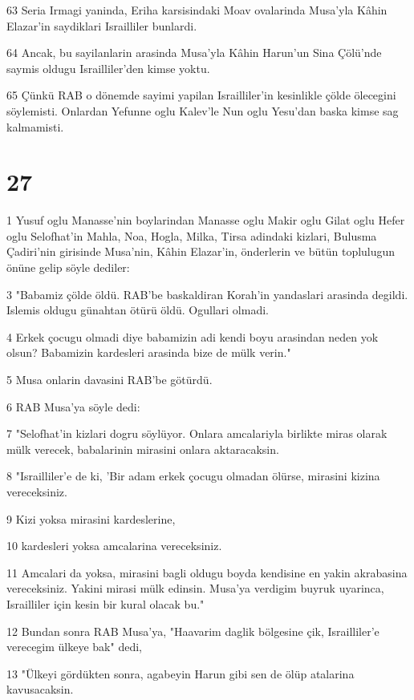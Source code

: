\par 63 Seria Irmagi yaninda, Eriha karsisindaki Moav ovalarinda Musa'yla Kâhin Elazar'in saydiklari Israilliler bunlardi.
\par 64 Ancak, bu sayilanlarin arasinda Musa'yla Kâhin Harun'un Sina Çölü'nde saymis oldugu Israilliler'den kimse yoktu.
\par 65 Çünkü RAB o dönemde sayimi yapilan Israilliler'in kesinlikle çölde ölecegini söylemisti. Onlardan Yefunne oglu Kalev'le Nun oglu Yesu'dan baska kimse sag kalmamisti.

\chapter{27}

\par 1 Yusuf oglu Manasse'nin boylarindan Manasse oglu Makir oglu Gilat oglu Hefer oglu Selofhat'in Mahla, Noa, Hogla, Milka, Tirsa adindaki kizlari, Bulusma Çadiri'nin girisinde Musa'nin, Kâhin Elazar'in, önderlerin ve bütün toplulugun önüne gelip söyle dediler:
\par 3 "Babamiz çölde öldü. RAB'be baskaldiran Korah'in yandaslari arasinda degildi. Islemis oldugu günahtan ötürü öldü. Ogullari olmadi.
\par 4 Erkek çocugu olmadi diye babamizin adi kendi boyu arasindan neden yok olsun? Babamizin kardesleri arasinda bize de mülk verin."
\par 5 Musa onlarin davasini RAB'be götürdü.
\par 6 RAB Musa'ya söyle dedi:
\par 7 "Selofhat'in kizlari dogru söylüyor. Onlara amcalariyla birlikte miras olarak mülk verecek, babalarinin mirasini onlara aktaracaksin.
\par 8 "Israilliler'e de ki, 'Bir adam erkek çocugu olmadan ölürse, mirasini kizina vereceksiniz.
\par 9 Kizi yoksa mirasini kardeslerine,
\par 10 kardesleri yoksa amcalarina vereceksiniz.
\par 11 Amcalari da yoksa, mirasini bagli oldugu boyda kendisine en yakin akrabasina vereceksiniz. Yakini mirasi mülk edinsin. Musa'ya verdigim buyruk uyarinca, Israilliler için kesin bir kural olacak bu."
\par 12 Bundan sonra RAB Musa'ya, "Haavarim daglik bölgesine çik, Israilliler'e verecegim ülkeye bak" dedi,
\par 13 "Ülkeyi gördükten sonra, agabeyin Harun gibi sen de ölüp atalarina kavusacaksin.
